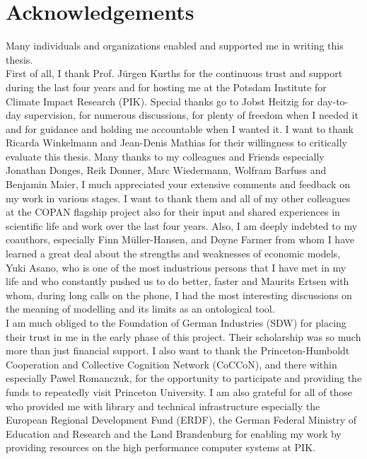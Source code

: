 
\chapter*{Acknowledgements}
\begin{minipage}[t][0pt]{\linewidth}

Many individuals and organizations enabled and supported me in writing this thesis.\\

 First of all, I thank Prof. J\"{u}rgen Kurths for the continuous trust and support during the last four years and for hosting me at the Potsdam Institute for Climate Impact Research (PIK). Special thanks go to Jobst Heitzig for day-to-day supervision, for numerous discussions, for plenty of freedom when I needed it and for guidance and holding me accountable when I wanted it.
 I want to thank Ricarda Winkelmann and Jean-Denis Mathias for their willingness to critically evaluate this thesis.
 Many thanks to my colleagues and Friends especially Jonathan Donges, Reik Donner, Marc Wiedermann, Wolfram Barfuss and Benjamin Maier, I much appreciated your extensive comments and feedback on my work in various stages. I want to thank them and all of my other colleagues at the COPAN flagship project also for their input and shared experiences in scientific life and work over the last four years.
 Also, I am deeply indebted to my coauthors, especially Finn M\"{u}ller-Hansen, and Doyne Farmer from whom I have learned a great deal about the strengths and weaknesses of economic models, Yuki Asano, who is one of the most industrious persons that I have met in my life and who constantly pushed us to do better, faster and Maurits Ertsen with whom, during long calls on the phone, I had the most interesting discussions on the meaning of modelling and its limits as an ontological tool.\\


 I am much obliged to the Foundation of German Industries (SDW) for placing their trust in me in the early phase of this project. Their scholarship was so much more than just financial support. I also want to thank the Princeton-Humboldt Cooperation and Collective Cognition Network (CoCCoN), and there within especially Pawel Romanczuk, for the opportunity to participate and providing the funds to repeatedly visit Princeton University.
 I am also grateful for all of those who provided me with library and technical infrastructure especially the European Regional Development Fund (ERDF), the German Federal Ministry of Education and Research and the Land Brandenburg for enabling my work by providing resources on the high performance computer systems at PIK.\\


\end{minipage}
